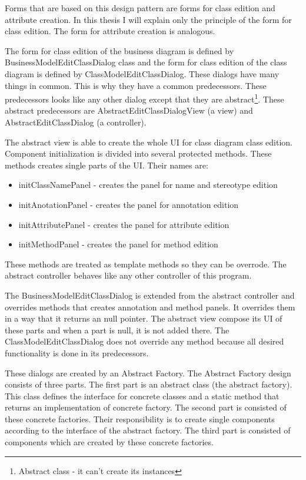 Forms that are based on this design pattern are forms for class edition and attribute creation. In this thesis I will explain only the principle of the form for class edition. The form for attribute creation is analogous.

The form for class edition of the business diagram is defined by BusinessModelEditClassDialog class and the form for class edition of the class diagram is defined by ClassModelEditClassDialog. These dialogs have many things in common. This is why they have a common predecessors. These predecessors looks like any other dialog except that they are abstract\footnote{Abstract class - it can't create its instances}. These abstract predecessors are AbstractEditClassDialogView (a view) and AbstractEditClassDialog (a controller). 

The abstract view is able to create the whole UI for class diagram class edition. Component initialization is divided into several protected methods. These methods creates single parts of the UI. Their names are: 

\begin{itemize}
    \item initClassNamePanel - creates the panel for name and stereotype edition
    \item initAnotationPanel - creates the panel for annotation edition
    \item initAttributePanel - creates the panel for attribute edition
    \item initMethodPanel - creates the panel for method edition
\end{itemize}

These methods are treated as template methods so they can be overrode. The abstract controller behaves like any other controller of this program.

The BusinessModelEditClassDialog is extended from the abstract controller and overrides methods that creates annotation and method panels. It overrides them in a way that it returns an null pointer. The abstract view compose its UI of these parts and when a part is null, it is not added there. The ClassModelEditClassDialog does not override any method because all desired functionality is done in its predecessors.

These dialogs are created by an Abstract Factory. The Abstract Factory design consists of three parts. The first part is an abstract class (the abstract factory). This class defines the interface for concrete classes and a static method that returns an implementation of concrete factory. The second part is consisted of these concrete factories. Their responsibility is to create single components according to the interface of the abstract factory. The third part is consisted of components which are created by these concrete factories.

